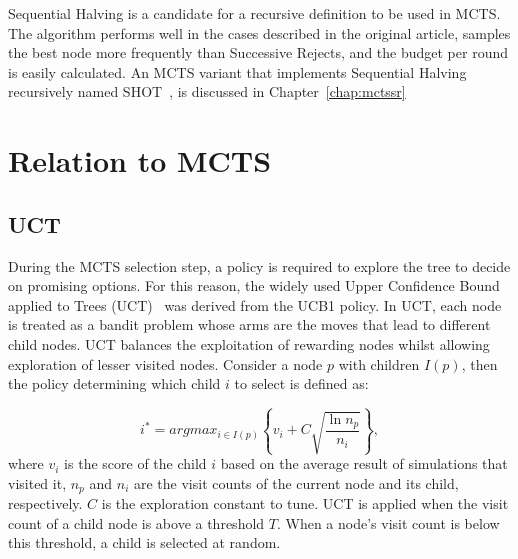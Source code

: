 \documentclass{kecsmstr}
\begin{document}
Sequential Halving is a candidate for a recursive definition to be used in MCTS. The algorithm performs well in the cases described in the original article, samples the best node more frequently than Successive Rejects, and the budget per round is easily calculated. An MCTS variant that implements Sequential Halving recursively named SHOT~, is discussed in Chapter~\ref{chap:mctssr}

\newpage

\section{Relation to MCTS}
\label{sec:mabmcts}
\subsection{UCT}
During the MCTS selection step, a policy is required to explore the tree to decide on promising options. For this reason, the widely used Upper Confidence Bound applied to Trees (UCT)~ was derived from the UCB1 policy. In UCT, each node is treated as a bandit problem whose arms are the moves that lead to different child nodes. UCT balances the exploitation of rewarding nodes whilst allowing exploration of lesser visited nodes. Consider a node $p$ with children $I(p)$, then the policy determining which child $i$ to select is defined as:

\begin{equation}
\label{eq:uct}
i^* = argmax_{i \in I(p)}\left\{ v_i + C \sqrt{ \frac{\ln{n_p}}{n_i}}\right\},
\end{equation}
where $v_i$ is the score of the child $i$ based on the average result of simulations that visited it, $n_p$ and $n_i$ are the visit counts of the current node and its child, respectively. $C$ is the exploration constant to tune. UCT is applied when the visit count of a child node is above a threshold $T$. When a node's visit count is below this threshold, a child is selected at random.
\end{document}
